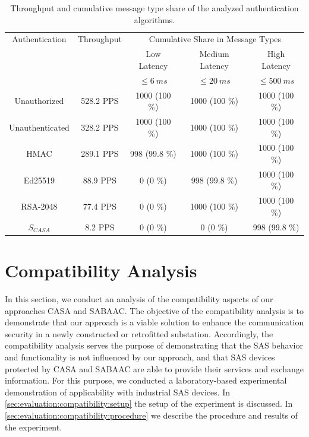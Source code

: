 \begin{table}
    \centering
    \small
    \caption{Throughput and cumulative message type share of the analyzed authentication algorithms.}
    \label{tab:rtt_share}
    \begin{tabular}{c c c c c}
    \toprule
    Authentication & Throughput & \multicolumn{3}{c}{Cumulative Share in Message Types}\\
    \cmidrule(lr){3-5}
     & & Low Latency & Medium Latency & High Latency\\
     & & $\leq 6~ms$ & $\leq 20~ms$ & $\leq 500~ms$\\
    \midrule
    Unauthorized    & 528.2 PPS & 1000 (100 \%) & 1000 (100 \%) & 1000 (100 \%) \\
    Unauthenticated & 328.2 PPS & 1000 (100 \%) & 1000 (100 \%) & 1000 (100 \%) \\
    HMAC            & 289.1 PPS &  998 (99.8 \%)& 1000 (100 \%) & 1000 (100 \%) \\
    Ed25519         &  88.9 PPS &    0 (0 \%)   &  998 (99.8 \%)& 1000 (100 \%) \\
    RSA-2048        &  77.4 PPS &    0 (0 \%)   & 1000 (100 \%) & 1000 (100 \%)\\
    $S_{CASA}$      &   8.2 PPS &    0 (0 \%)   &    0 (0 \%)   &  998 (99.8 \%)\\
    \bottomrule
    \end{tabular}
\end{table}

\section{Compatibility Analysis}
In this section, we conduct an analysis of the compatibility aspects of our approaches CASA and SABAAC.
The objective of the compatibility analysis is to demonstrate that our approach is a viable solution to enhance the communication security in a newly constructed or retrofitted substation.
Accordingly, the compatibility analysis serves the purpose of demonstrating that the SAS behavior and functionality is not influenced by our approach, and that SAS devices protected by CASA and SABAAC are able to provide their services and exchange information.
For this purpose, we conducted a laboratory-based experimental demonstration of applicability with industrial SAS devices.
In \autoref{sec:evaluation:compatibility:setup} the setup of the experiment is discussed.
In \autoref{sec:evaluation:compatibility:procedure} we describe the procedure and results of the experiment.

